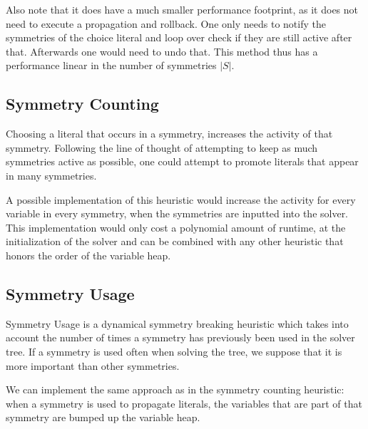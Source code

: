 	Also note that it does have a much smaller performance footprint, as it does not need to execute
	a propagation and rollback.
	One only needs to notify the symmetries of the choice literal and loop over check if they are
	still active after that.
	Afterwards one would need to undo that.
	This method thus has a performance linear in the number of symmetries $|S|$.

\subsection{Symmetry Counting}

	Choosing a literal that occurs in a symmetry, increases the activity of that symmetry.
	Following the line of thought of attempting to keep as much symmetries active as possible,
	one could attempt to promote literals that appear in many symmetries.

	A possible implementation of this heuristic would increase the activity for every variable in
	every symmetry, when the symmetries are inputted into the solver.
	This implementation would only cost a polynomial amount of runtime, at the initialization of the
	solver and can be combined with any other heuristic that honors the order of the variable heap.

\subsection{Symmetry Usage}
	Symmetry Usage is a dynamical symmetry breaking heuristic
	which takes into account the number of times a symmetry has previously been used in the solver tree.
	If a symmetry is used often when solving the tree, we suppose that it is more important than other symmetries.

	We can implement the same approach as in the symmetry counting heuristic: when a symmetry is
	used to propagate literals, the variables that are part of that symmetry are bumped up the
	variable heap.



